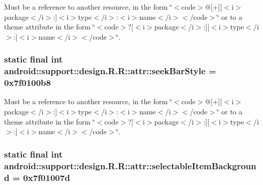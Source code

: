Must be a reference to another resource, in the form \char`\"{}$<$code$>$@\mbox{[}+\mbox{]}\mbox{[}$<$i$>$package$<$/i$>$:\mbox{]}$<$i$>$type$<$/i$>$:$<$i$>$name$<$/i$>$$<$/code$>$\char`\"{} or to a theme attribute in the form \char`\"{}$<$code$>$?\mbox{[}$<$i$>$package$<$/i$>$:\mbox{]}\mbox{[}$<$i$>$type$<$/i$>$:\mbox{]}$<$i$>$name$<$/i$>$$<$/code$>$\char`\"{}. \hypertarget{classandroid_1_1support_1_1design_1_1_r_1_1attr_a03ffb81c5d11f2af08b3983ba3e1e47}{
\subsubsection[{seekBarStyle}]{\setlength{\rightskip}{0pt plus 5cm}static final int android::support::design.R.R::attr::seekBarStyle = 0x7f0100b8}}
\label{classandroid_1_1support_1_1design_1_1_r_1_1attr_a03ffb81c5d11f2af08b3983ba3e1e47}


Must be a reference to another resource, in the form \char`\"{}$<$code$>$@\mbox{[}+\mbox{]}\mbox{[}$<$i$>$package$<$/i$>$:\mbox{]}$<$i$>$type$<$/i$>$:$<$i$>$name$<$/i$>$$<$/code$>$\char`\"{} or to a theme attribute in the form \char`\"{}$<$code$>$?\mbox{[}$<$i$>$package$<$/i$>$:\mbox{]}\mbox{[}$<$i$>$type$<$/i$>$:\mbox{]}$<$i$>$name$<$/i$>$$<$/code$>$\char`\"{}. \hypertarget{classandroid_1_1support_1_1design_1_1_r_1_1attr_4c054362ee3b82b68d7a160c4000b3d4}{
\subsubsection[{selectableItemBackground}]{\setlength{\rightskip}{0pt plus 5cm}static final int android::support::design.R.R::attr::selectableItemBackground = 0x7f01007d}}
\label{classandroid_1_1support_1_1design_1_1_r_1_1attr_4c054362ee3b82b68d7a160c4000b3d4}


